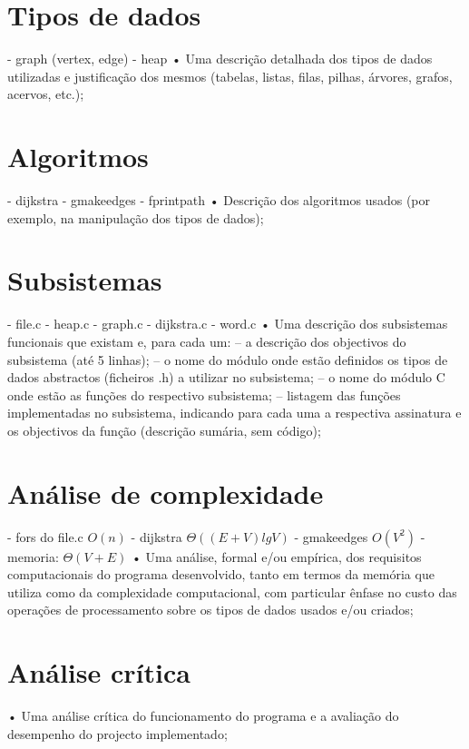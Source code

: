 \documentclass[a4paper, 18pt]{article}
\begin{document}
\section{Tipos de dados}
	- graph (vertex, edge)
	- heap
• Uma descrição detalhada dos tipos de dados utilizadas e justificação dos mesmos
(tabelas, listas, filas, pilhas, árvores, grafos, acervos, etc.);

\section{Algoritmos}
	- dijkstra
	- g\textunderscore make\textunderscore edges
	- fprint\textunderscore path
• Descrição dos algoritmos usados (por exemplo, na manipulação dos tipos de dados);

\section{Subsistemas}
	- file.c
	- heap.c
	- graph.c
	- dijkstra.c
	- word.c
• Uma descrição dos subsistemas funcionais que existam e, para cada um:
	– a descrição dos objectivos do subsistema (até 5 linhas);
	– o nome do módulo onde estão definidos os tipos de dados abstractos
	  (ficheiros .h) a utilizar no subsistema;
	– o nome do módulo C onde estão as funções do respectivo subsistema;
	– listagem das funções implementadas no subsistema, indicando para cada uma a
	  respectiva assinatura e os objectivos da função (descrição sumária, sem código);

\section{Análise de complexidade}
	- fors do file.c $O(n)$
	- dijkstra $\Theta((E+V) lg V)$
	- g\textunderscore make\textunderscore edges $O(V^2)$
	- memoria: $\Theta(V + E)$
• Uma análise, formal e/ou empírica, dos requisitos computacionais do programa desenvolvido, tanto em termos da memória que utiliza como da complexidade computacional, com particular ênfase no custo das operações de processamento sobre os tipos de dados usados e/ou criados;

\section{Análise crítica}
• Uma análise crítica do funcionamento do programa e a avaliação do desempenho
do projecto implementado;
\end{document}
